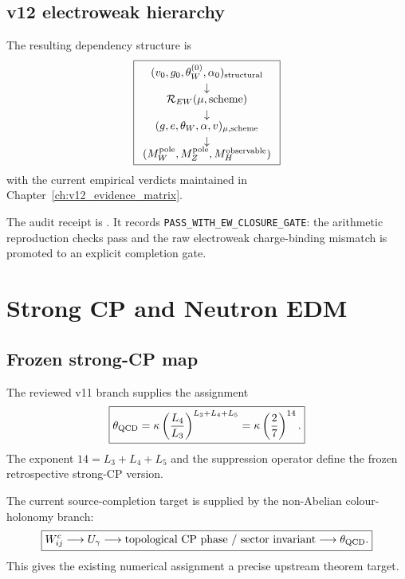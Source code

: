 \section{v12 electroweak hierarchy}

The resulting dependency structure is
\[
\boxed{
\begin{array}{c}
(v_0,g_0,\theta_W^{(0)},\alpha_0)_{\rm structural}\\[2pt]
\downarrow\\[-2pt]
\mathcal R_{EW}(\mu,\mathrm{scheme})\\[2pt]
\downarrow\\[-2pt]
(g,e,\theta_W,\alpha,v)_{\mu,\mathrm{scheme}}\\[2pt]
\downarrow\\[-2pt]
(M_W^{\rm pole},M_Z^{\rm pole},M_H^{\rm observable})
\end{array}}
\]
with the current empirical verdicts maintained in Chapter~\ref{ch:v12_evidence_matrix}.

The audit receipt is
. It records \texttt{PASS\_WITH\_EW\_CLOSURE\_GATE}: the arithmetic reproduction checks pass and the raw electroweak charge-binding mismatch is promoted to an explicit completion gate.

\clearpage

\chapter{Strong CP and Neutron EDM}
\label{ch:v12_strong_cp_edm}

\section{Frozen strong-CP map}

The reviewed v11 branch supplies the assignment
\begin{equation}
\boxed{
\theta_{\rm QCD}
=\kappa\left(\frac{L_4}{L_3}\right)^{L_3+L_4+L_5}
=\kappa\left(\frac27\right)^{14}.
}
\label{eq:v12_theta_qcd}
\end{equation}
The exponent $14=L_3+L_4+L_5$ and the suppression operator define the frozen retrospective strong-CP version.

The current source-completion target is supplied by the non-Abelian colour-holonomy branch:
\begin{equation}
\boxed{
W_{ij}^{c}
\longrightarrow
U_\gamma
\longrightarrow
\text{topological CP phase / sector invariant}
\longrightarrow
\theta_{\rm QCD}.
}
\label{eq:v12_strongcp_source_axis}
\end{equation}
This gives the existing numerical assignment a precise upstream theorem target.

